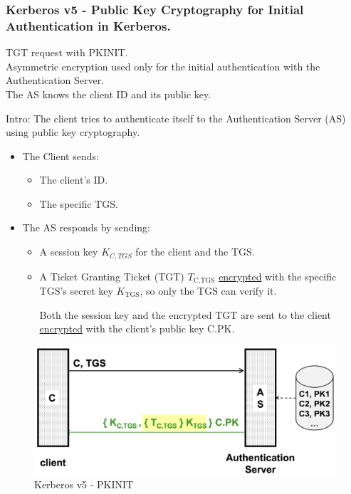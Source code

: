 \subsubsection*{Kerberos v5 - Public Key Cryptography for Initial Authentication in Kerberos.}
\begin{center}
    TGT request with PKINIT.
    \\ Asymmetric encryption used only for the initial authentication with the Authentication Server.
    \\The AS knows the client ID and its public key.
\end{center}
Intro: The client tries to authenticate itself to the Authentication Server (AS) using public key cryptography.
\begin{itemize}
    \item The Client sends:
    \begin{itemize}
        \item The client's ID.
        \item The specific TGS.
    \end{itemize}
    \item The AS responds by sending:
    \begin{itemize}
        \item A session key $K_{C,TGS}$ for the client and the TGS.
        \item A Ticket Granting Ticket (TGT)  $T_{\text{C,TGS}}$ \underline{encrypted} with the specific TGS's secret key $K_{\text{TGS}}$, so only the TGS can verify it.
        \begin{center}
            Both the session key and the encrypted TGT are sent to the client \underline{encrypted} with the client's public key $\text{C.PK}$.
        \end{center}
        
    \end{itemize}
\end{itemize}
\begin{figure}[H]
    \centering
    \includegraphics[width=0.5\linewidth]{Images/Authentication/kerv5.png}
    \caption{Kerberos v5 - PKINIT}
\end{figure}

